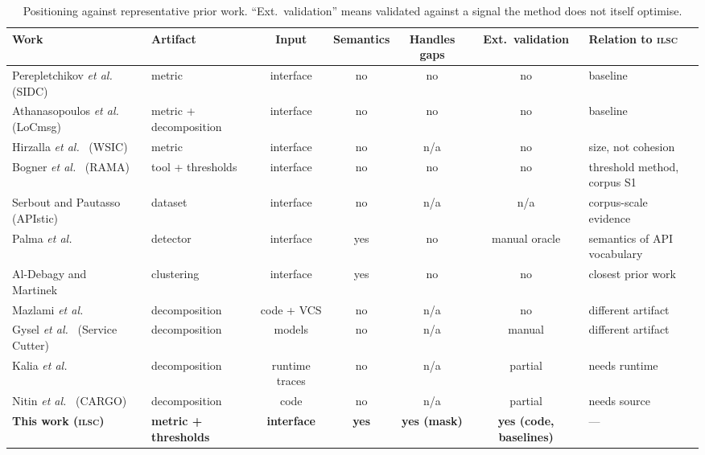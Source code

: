 \documentclass[journal]{IEEEtran}
\newcommand{\ilsc}{\textsc{ilsc}}
\begin{document}
\begin{table}[!t]
\caption{Positioning against representative prior work. ``Ext.\ validation''
means validated against a signal the method does not itself optimise.}
\label{tab:related}
\centering
\footnotesize
\begin{tabular}{@{}llccccl@{}}
\toprule
\textbf{Work} & \textbf{Artifact} & \textbf{Input} & \textbf{Semantics} &
\textbf{Handles gaps} & \textbf{Ext.\ validation} & \textbf{Relation to \ilsc{}} \\
\midrule
Perepletchikov \emph{et al.}~\cite{perepletchikov2007cohesion} (SIDC) & metric & interface & no & no & no & baseline \\
Athanasopoulos \emph{et al.}~\cite{athanasopoulos2015cohesion} (LoCmsg) & metric + decomposition & interface & no & no & no & baseline \\
Hirzalla \emph{et al.}~\cite{hirzalla2009metrics} (WSIC) & metric & interface & no & n/a & no & size, not cohesion \\
Bogner \emph{et al.}~\cite{bogner2020rama} (RAMA) & tool + thresholds & interface & no & no & no & threshold method, corpus S1 \\
Serbout and Pautasso~\cite{apistic2024} (APIstic) & dataset & interface & no & n/a & n/a & corpus-scale evidence \\
Palma \emph{et al.}~\cite{palma2015restful,palma2022linguistic} & detector & interface & yes & no & manual oracle & semantics of API vocabulary \\
Al-Debagy and Martinek~\cite{aldebagy2020extracting} & clustering & interface & yes & no & no & closest prior work \\
Mazlami \emph{et al.}~\cite{mazlami2017extraction} & decomposition & code + VCS & no & n/a & no & different artifact \\
Gysel \emph{et al.}~\cite{gysel2016service} (Service Cutter) & decomposition & models & no & n/a & manual & different artifact \\
Kalia \emph{et al.}~\cite{kalia2021mono2micro} & decomposition & runtime traces & no & n/a & partial & needs runtime \\
Nitin \emph{et al.}~\cite{nitin2022cargo} (CARGO) & decomposition & code & no & n/a & partial & needs source \\
\midrule
\textbf{This work (\ilsc{})} & \textbf{metric + thresholds} & \textbf{interface} &
\textbf{yes} & \textbf{yes (mask)} & \textbf{yes (code, baselines)} & --- \\
\bottomrule
\end{tabular}
\end{table}
\end{document}
